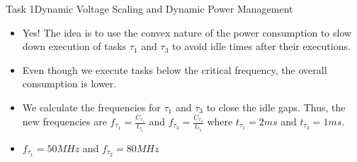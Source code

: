 \begin{frame}{Task 1}{Dynamic Voltage Scaling and Dynamic Power Management}
    \begin{solutionnoinc}
        \begin{itemize}
            \item Yes! The idea is to use the convex nature of the power consumption to slow down execution of tasks $\tau_1$ and $\tau_3$ to avoid idle times after their executions.
            \item Even though we execute tasks below the critical frequency, the overall consumption is lower.
            \item We calculate the frequencies for $\tau_1$ and $\tau_3$ to close the idle gaps. Thus, the new frequencies are $f_{\tau_1} = \frac{C_{\tau_1}}{t_{\tau_1}}$ and $f_{\tau_3} = \frac{C_{\tau_3}}{t_{\tau_3}}$ where $t_{\tau_1} = 2ms$ and $t_{\tau_3} = 1ms$.
            \item $f_{\tau_1} = 50MHz$ and $f_{\tau_2} = 80MHz$
        \end{itemize}
    \end{solutionnoinc}
\end{frame}

